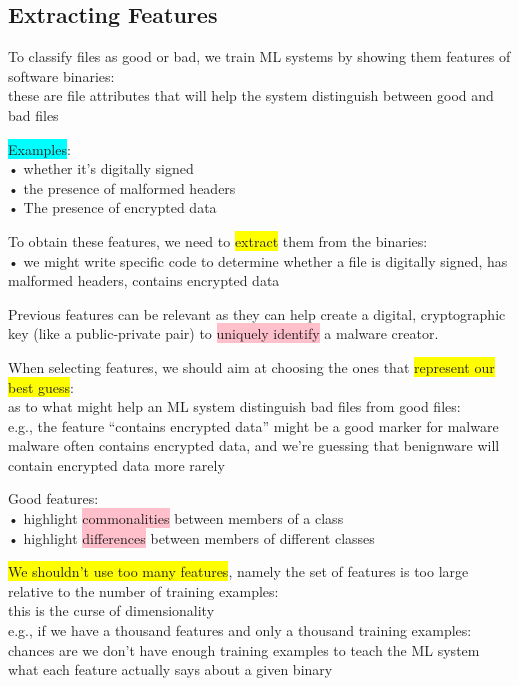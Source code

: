 \documentclass[]{project_plan}
\begin{document}
\subsection{Extracting Features}

To classify files as good or bad, we train ML systems by showing them features of software binaries:\\
these are file attributes that will help the system distinguish between good and bad files

\colorbox{cyan}{Examples}:\\
• whether it’s digitally signed\\
• the presence of malformed headers\\
• The presence of encrypted data

To obtain these features, we need to \colorbox{yellow}{extract} them from the binaries:\\
• we might write specific code to determine whether a file is digitally signed, has malformed headers, contains encrypted data

Previous features can be relevant as they can help create a digital, cryptographic key
(like a public-private pair) to \colorbox{pink}{uniquely identify} a malware creator.

When selecting features, we should aim at choosing the ones that \colorbox{yellow}{represent our best guess}:\\
as to what might help an ML system distinguish bad files from good files:\\
e.g., the feature “contains encrypted data” might be a good marker for malware\\
malware often contains encrypted data, and we’re guessing that benignware will contain encrypted data more rarely

Good features:\\
• highlight \colorbox{pink}{commonalities} between members of a class\\
• highlight \colorbox{pink}{differences} between members of different classes

\colorbox{yellow}{We shouldn’t use too many features}, namely the set of features is too large relative to the number of training examples:\\
this is the curse of dimensionality\\
e.g., if we have a thousand features and only a thousand training examples:\\
chances are we don’t have enough training examples to teach the ML system what each feature actually says about a given binary
\end{document}
